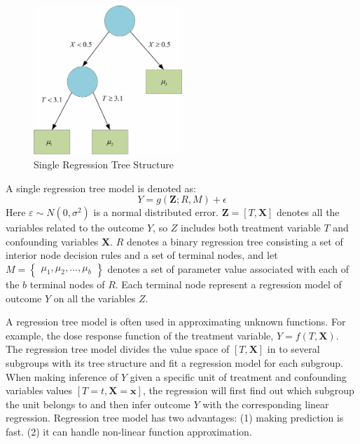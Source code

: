 \begin{figure}[!thpb]
\centering
\includegraphics[width=0.5\textwidth]{chapter4_SingleRGT.pdf}
\caption{Single Regression Tree Structure}
\label{singlergt}
\end{figure}

A single regression tree model is denoted as:
\begin{equation*}
Y=g(\pmb{Z}; R, M)+\epsilon
\end{equation*}
Here $\varepsilon  \sim N(0,{\sigma ^2})$ is a normal distributed error. $\pmb{Z}=[T,\pmb{X}]$ denotes all the variables related to the outcome $Y$, so $Z$ includes both treatment variable $T$ and confounding variables $\pmb{X}$. $R$ denotes a binary regression tree consisting a set of interior node decision rules and a set of terminal nodes, and let $M=
\begin{Bmatrix}
 \mu _1, \mu _2, . . ., \mu _b
\end{Bmatrix}$
denotes a set of parameter value associated with each of the $b$ terminal nodes of $R$. Each terminal node represent a regression model of outcome $Y$ on all the variables $Z$.

A regression tree model is often used in approximating unknown functions. For example, the dose response function of the treatment variable, $Y=f(T,\pmb{X})$. The regression tree model divides the value space of $[T,\pmb{X}]$ in to several subgroups with its tree structure and fit a regression model for each subgroup. When making inference of $Y$ given a specific unit of treatment and confounding variables values $[T=t,\pmb{X}=\pmb{x}]$, the regression will first find out which subgroup the unit belongs to and then infer outcome $Y$ with the corresponding linear regression. Regression tree model has two advantages: (1) making prediction is fast. (2) it can handle non-linear function approximation.


